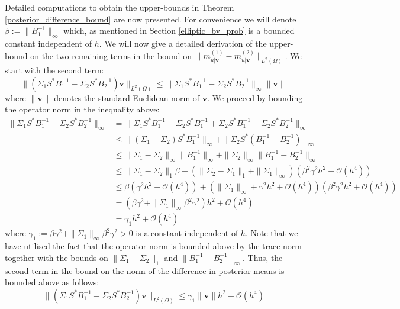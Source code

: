 Detailed computations to obtain the upper-bounds in Theorem \textcolor{blue}{\ref{posterior_difference_bound}} are now presented. For convenience we will denote $\beta:=\|B_{1}^{-1}\|_{\infty}$ which, as mentioned in Section \textcolor{blue}{\ref{elliptic_bv_prob}} is a bounded constant independent of $h$. We will now give a detailed derivation of the upper-bound on the two remaining terms in the bound on $\|m^{(1)}_{u|\mathbf{v}}-m^{(2)}_{u|\mathbf{v}}\|_{L^{2}(\Omega)}$. We start with the second term:
\begin{equation*}
    \|(\Sigma_{1}S^{*}B_{1}^{-1}-\Sigma_{2}S^{*}B_{2}^{-1})\mathbf{v}\|_{L^{2}(\Omega)}\leq\|\Sigma_{1}S^{*}B_{1}^{-1}-\Sigma_{2}S^{*}B_{2}^{-1}\|_{\infty}\|\mathbf{v}\|
\end{equation*}
where $\|\mathbf{v}\|$ denotes the standard Euclidean norm of $\mathbf{v}$. We proceed by bounding the operator norm in the inequality above:
\begin{align*}
    \|\Sigma_{1}S^{*}B_{1}^{-1}-\Sigma_{2}S^{*}B_{2}^{-1}\|_{\infty} &= \|\Sigma_{1}S^{*}B_{1}^{-1}-\Sigma_{2}S^{*}B_{1}^{-1}+\Sigma_{2}S^{*}B_{1}^{-1}-\Sigma_{2}S^{*}B_{2}^{-1}\|_{\infty} \\
    &\leq \|(\Sigma_1-\Sigma_2)S^{*}B_{1}^{-1}\|_{\infty}+\|\Sigma_{2}S^{*}(B_{1}^{-1}-B_{2}^{-1})\|_{\infty} \\
    &\leq\|\Sigma_1-\Sigma_2\|_{\infty}\|B_{1}^{-1}\|_{\infty}+\|\Sigma_{2}\|_{\infty}\|B_{1}^{-1}-B_{2}^{-1}\|_{\infty} \\
    &\leq \|\Sigma_{1}-\Sigma_{2}\|_{1}\beta+(\|\Sigma_2-\Sigma_{1}\|_{1}+\|\Sigma_{1}\|_{\infty})(\beta^{2}\gamma^{2}h^{2}+\mathcal{O}(h^{4})) \\
    &\leq\beta(\gamma^{2}h^{2}+\mathcal{O}(h^4))+(\|\Sigma_1\|_{\infty}+\gamma^{2}h^{2}+\mathcal{O}(h^4))(\beta^{2}\gamma^{2}h^{2}+\mathcal{O}(h^4)) \\
    &=(\beta\gamma^{2}+\|\Sigma_1\|_{\infty}\beta^{2}\gamma^{2})h^{2}+\mathcal{O}(h^4) \\
    &=\gamma_{1}h^{2}+\mathcal{O}(h^4)
\end{align*}
where $\gamma_{1}:=\beta\gamma^{2}+\|\Sigma_{1}\|_{\infty}\beta^{2}\gamma^{2}>0$ is a constant independent of $h$. Note that we have utilised the fact that the operator norm is bounded above by the trace norm together with the bounds on $\|\Sigma_{1}-\Sigma_{2}\|_{1}$ and $\|B_{1}^{-1}-B_{2}^{-1}\|_{\infty}$. Thus, the second term in the bound on the norm of the difference in posterior means is bounded above as follows:
\begin{equation*}
    \|(\Sigma_{1}S^{*}B_{1}^{-1}-\Sigma_{2}S^{*}B_{2}^{-1})\mathbf{v}\|_{L^{2}(\Omega)}\leq\gamma_{1}\|\mathbf{v}\|h^{2}+\mathcal{O}(h^4)
\end{equation*}

